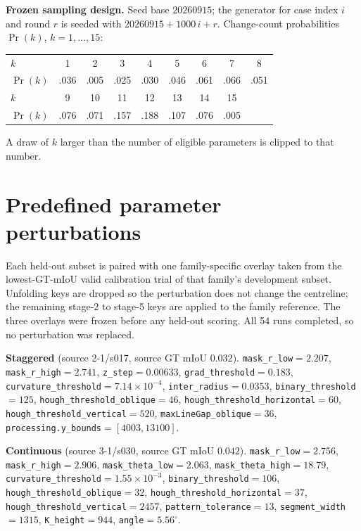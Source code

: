 \documentclass[a4paper,fleqn]{cas-dc}
\begin{document}
{\begin{hlbox}
\noindent\textbf{Frozen sampling design.} Seed base $20260915$; the generator for case index $i$ and round $r$ is seeded with $20260915+1000\,i+r$. Change-count probabilities $\Pr(k)$, $k=1,\ldots,15$:
\begin{center}
\small
\setlength{\tabcolsep}{3.5pt}
\begin{tabular}{@{}l cccccccc@{}}
\toprule
$k$ & 1 & 2 & 3 & 4 & 5 & 6 & 7 & 8 \\
$\Pr(k)$ & .036 & .005 & .025 & .030 & .046 & .061 & .066 & .051 \\
\midrule
$k$ & 9 & 10 & 11 & 12 & 13 & 14 & 15 & \\
$\Pr(k)$ & .076 & .071 & .157 & .188 & .107 & .076 & .005 & \\
\bottomrule
\end{tabular}
\end{center}
A draw of $k$ larger than the number of eligible parameters is clipped to that number.
\end{hlbox}

\section{Predefined parameter perturbations}\label{app:degradation}

Each held-out subset is paired with one family-specific overlay taken from the lowest-GT-mIoU valid calibration trial of that family's development subset. Unfolding keys are dropped so the perturbation does not change the centreline; the remaining stage-2 to stage-5 keys are applied to the family reference. The three overlays were frozen before any held-out scoring. All 54 runs completed, so no perturbation was replaced.

\begin{hlbox}
\small
\noindent\textbf{Staggered} (source 2-1/s017, source GT mIoU $0.032$).
\texttt{mask\_r\_low}$=2.207$,
\texttt{mask\_r\_high}$=2.741$,
\texttt{z\_step}$=0.00633$,
\texttt{grad\_threshold}$=0.183$,
\texttt{curvature\_threshold}$=7.14\times10^{-4}$,
\texttt{inter\_radius}$=0.0353$,
\texttt{binary\_threshold}$=125$,
\texttt{hough\_threshold\_oblique}$=46$,
\texttt{hough\_threshold\_horizontal}$=60$,
\texttt{hough\_threshold\_vertical}$=520$,
\texttt{maxLineGap\_oblique}$=36$,
\texttt{processing.y\_bounds}$=[4003,13100]$.

\medskip
\noindent\textbf{Continuous} (source 3-1/s030, source GT mIoU $0.042$).
\texttt{mask\_r\_low}$=2.756$,
\texttt{mask\_r\_high}$=2.906$,
\texttt{mask\_theta\_low}$=2.063$,
\texttt{mask\_theta\_high}$=18.79$,
\texttt{curvature\_threshold}$=1.55\times10^{-3}$,
\texttt{binary\_threshold}$=106$,
\texttt{hough\_threshold\_oblique}$=32$,
\texttt{hough\_threshold\_horizontal}$=37$,
\texttt{hough\_threshold\_vertical}$=2457$,
\texttt{pattern\_tolerance}$=13$,
\texttt{segment\_width}$=1315$,
\texttt{K\_height}$=944$,
\texttt{angle}$=5.56^{\circ}$.


\end{hlbox}}
\end{document}
